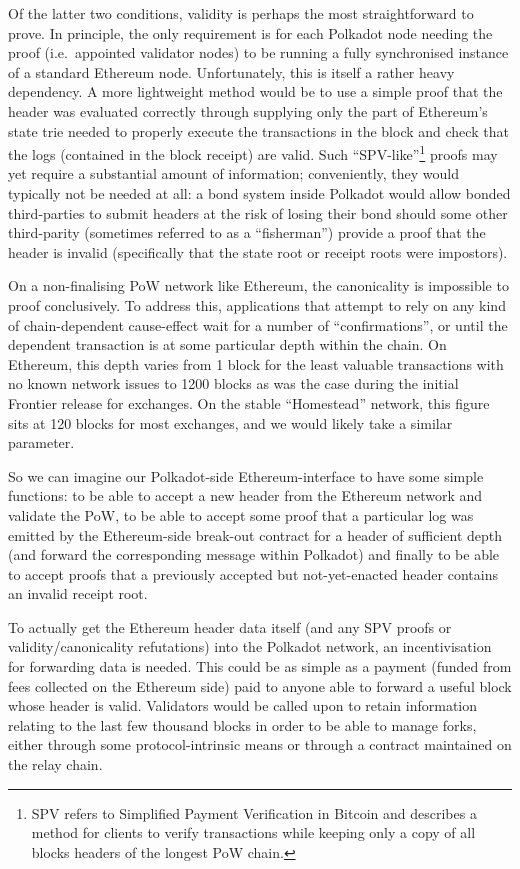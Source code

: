 \documentclass[9pt,oneside]{amsart}
\begin{document}
\begin{multicols}{2}
 Of the latter two conditions, validity is perhaps the most straightforward to prove. In principle, the only requirement is for each Polkadot node needing the proof (i.e.~appointed validator nodes) to be running a fully synchronised instance of a standard Ethereum node. Unfortunately, this is itself a rather heavy dependency. A more lightweight method would be to use a simple proof that the header was evaluated correctly through supplying only the part of Ethereum's state trie needed to properly execute the transactions in the block and check that the logs (contained in the block receipt) are valid. Such ``SPV-like''\footnote{SPV refers to Simplified Payment Verification in Bitcoin and describes a method for clients to verify transactions while keeping only a copy of all blocks headers of the longest PoW chain.} proofs may yet require a substantial amount of information; conveniently, they would typically not be needed at all: a bond system inside Polkadot would allow bonded third-parties to submit headers at the risk of losing their bond should some other third-parity (sometimes referred to as a ``fisherman'') provide a proof that the header is invalid (specifically that the state root or receipt roots were impostors).

 On a non-finalising PoW network like Ethereum, the canonicality is impossible to proof conclusively. To address this, applications that attempt to rely on any kind of chain-dependent cause-effect wait for a number of ``confirmations'', or until the dependent transaction is at some particular depth within the chain. On Ethereum, this depth varies from 1 block for the least valuable transactions with no known network issues to 1200 blocks as was the case during the initial Frontier release for exchanges. On the stable ``Homestead'' network, this figure sits at 120 blocks for most exchanges, and we would likely take a similar parameter.

 So we can imagine our Polkadot-side Ethereum-interface to have some simple functions: to be able to accept a new header from the Ethereum network and validate the PoW, to be able to accept some proof that a particular log was emitted by the Ethereum-side break-out contract for a header of sufficient depth (and forward the corresponding message within Polkadot) and finally to be able to accept proofs that a previously accepted but not-yet-enacted header contains an invalid receipt root.

 To actually get the Ethereum header data itself (and any SPV proofs or validity/canonicality refutations) into the Polkadot network, an incentivisation for forwarding data is needed. This could be as simple as a payment (funded from fees collected on the Ethereum side) paid to anyone able to forward a useful block whose header is valid. Validators would be called upon to retain information relating to the last few thousand blocks in order to be able to manage forks, either through some protocol-intrinsic means or through a contract maintained on the relay chain.


\end{multicols}
\end{document}
